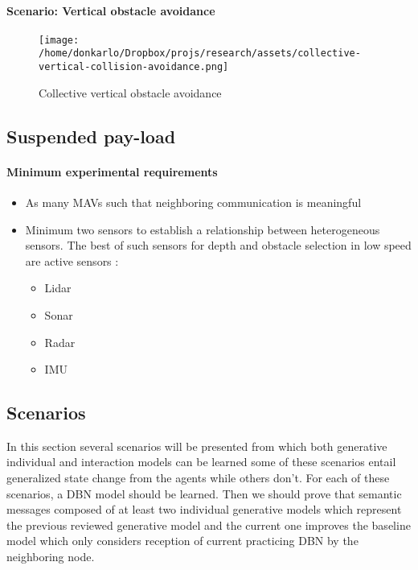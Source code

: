 \documentclass{article}
\begin{document}
			\paragraph{Scenario: Vertical obstacle avoidance}
				\begin{figure*}
					\centering
					\texttt{[image: /home/donkarlo/Dropbox/projs/research/assets/collective-vertical-collision-avoidance.png]}
					\caption{Collective vertical obstacle avoidance}
					\label{fig:swarm-drones-reference-task}
				\end{figure*}
		\subsection{Suspended pay-load}
			\paragraph{Minimum experimental requirements}
				\begin{itemize}
					\item As many MAVs such that neighboring communication is meaningful
					\item Minimum two sensors to establish a relationship between heterogeneous sensors. The best of such sensors for depth and obstacle selection in low speed are active sensors \citep{apatean-2007-sensors-for-obstacle-detection-a-survey}: 
				  	\begin{itemize}
						\item Lidar
						\item Sonar
						\item Radar
						\item IMU
				  	\end{itemize}
			  	\end{itemize}
			\subsection{Scenarios} \label{experimental-scenarios}
				In this section several scenarios will be presented from which both generative individual and interaction models can be learned
				some of these scenarios entail generalized state change from the agents while others don't. For each of these scenarios, a DBN model should be learned. Then we should prove that semantic messages composed of at least two individual generative models which represent the previous reviewed generative model and the current one improves the baseline model which only considers reception of current practicing DBN by the neighboring node.
				
\end{document}
